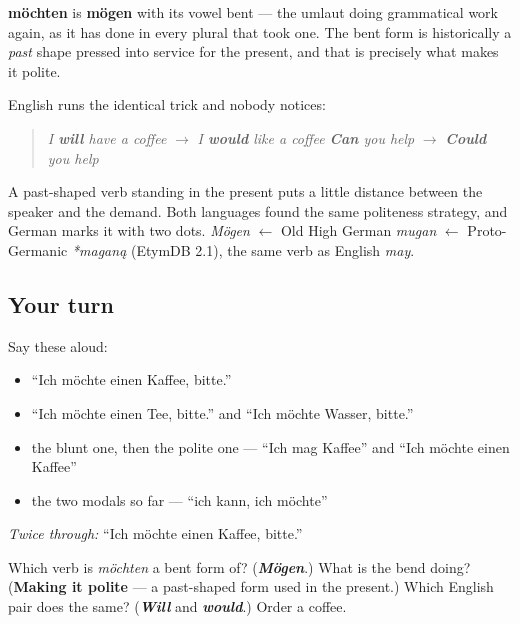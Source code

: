 \begin{cousinweb}
\textbf{möchten} is \textbf{mögen} with its vowel bent — the umlaut doing grammatical work again, as it has done in every plural that took one. The bent form is historically a \emph{past} shape pressed into service for the present, and that is precisely what makes it polite.

English runs the identical trick and nobody notices:

\begin{quote}
\emph{I \textbf{will} have a coffee} $\to$ \emph{I \textbf{would} like a coffee} \emph{\textbf{Can} you help} $\to$ \emph{\textbf{Could} you help}
\end{quote}

A past-shaped verb standing in the present puts a little distance between the speaker and the demand. Both languages found the same politeness strategy, and German marks it with two dots. \emph{Mögen} $\leftarrow$ Old High German \emph{mugan} $\leftarrow$ Proto-Germanic \emph{*maganą} (EtymDB 2.1), the same verb as English \emph{may}.
\end{cousinweb}

\subsection*{Your turn}
Say these aloud:

\begin{itemize}
\raggedright
  \item \textquotedblleft{}Ich möchte einen Kaffee, bitte.\textquotedblright{}
  \item \textquotedblleft{}Ich möchte einen Tee, bitte.\textquotedblright{} and \textquotedblleft{}Ich möchte Wasser, bitte.\textquotedblright{}
  \item the blunt one, then the polite one — \textquotedblleft{}Ich mag Kaffee\textquotedblright{} and \textquotedblleft{}Ich möchte einen Kaffee\textquotedblright{}
  \item the two modals so far — \textquotedblleft{}ich kann, ich möchte\textquotedblright{}
\end{itemize}

\emph{Twice through:} \textquotedblleft{}Ich möchte einen Kaffee, bitte.\textquotedblright{}

\begin{tcolorbox}[breakable,colback=teal!4,colframe=teal!35!black,title={Before you move on}]
Which verb is \emph{möchten} a bent form of? (\emph{\textbf{Mögen}}.) What is the bend doing? (\textbf{Making it polite} — a past-shaped form used in the present.) Which English pair does the same? (\emph{\textbf{Will}} and \emph{\textbf{would}}.) Order a coffee.
\end{tcolorbox}
